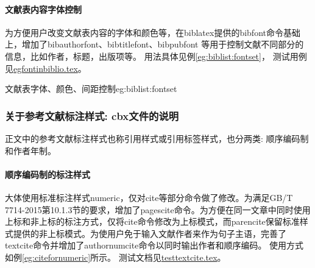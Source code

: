 
\paragraph{文献表内容字体控制} 为方便用户改变文献表内容的字体和颜色等，在biblatex提供的bibfont命令基础上，增加了bibauthorfont、bibtitlefont、bibpubfont 等用于控制文献不同部分的信息，比如作者，标题，出版项等。
用法具体见例\ref{eg:biblist:fontset}，
测试用例见\href{run:example/egfontinbiblio.tex}{egfontinbiblio.tex}。

\begin{example}{文献表字体、颜色、间距控制}{eg:biblist:fontset}
\begin{texlist}
%

%
\renewcommand{\bibfont}{\zihao{-5}}%
\renewcommand{\bibauthorfont}{\bfseries\color{teal}}%
\renewcommand{\bibtitlefont}{\ttfamily\color{blue}}%
\renewcommand{\bibpubfont}{\itshape\color{violet}}%
\def\UrlFont{\ttfamily} %

\setlength{\bibitemsep}{0ex}
\setlength{\bibnamesep}{0ex}
\setlength{\bibinitsep}{0ex}

\end{texlist}
\end{example}

\subsubsection{关于参考文献标注样式: cbx文件的说明}\label{sec:cbx:usage}
正文中的参考文献标注样式也称引用样式或引用标签样式，也分两类: 顺序编码制和作者年制。

\paragraph{顺序编码制的标注样式} 大体使用标准标注样式numeric，仅对cite等部分命令做了修改。为满足GB/T 7714-2015第10.1.3节的要求，增加了pagescite命令。为方便在同一文章中同时使用上标和非上标的标注方式，仅将cite命令修改为上标模式，而parencite保留标准样式提供的非上标模式。为使用户免于输入文献作者来作为句子主语，完善了textcite命令并增加了authornumcite命令以同时输出作者和顺序编码。
使用方式如例\ref{eg:citefornumeric}所示。
测试文档见\href{run:example/testtextcite.tex}{testtextcite.tex}。

